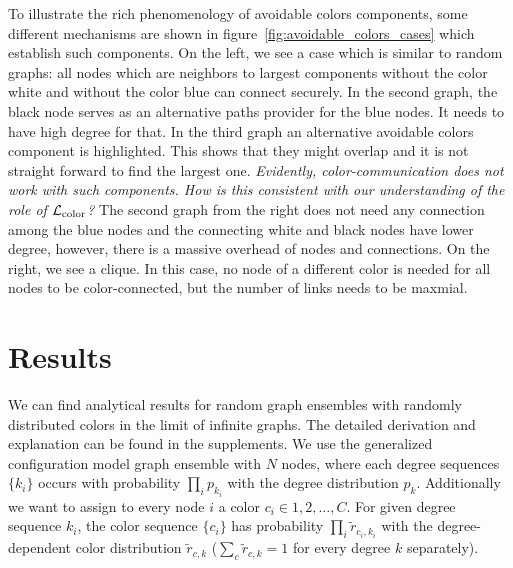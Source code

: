 \documentclass[aps, pre, twocolumn, a4paper, floatfix]{revtex4}
\newcommand{\red}{\color{red}}
\begin{document}
%
To illustrate the rich phenomenology of avoidable colors components,  
some different mechanisms are shown in figure~\ref{fig:avoidable_colors_cases} 
which establish such components.
On the left, we see a case which is similar to  random graphs: 
all nodes which are neighbors to largest components without 
the color white and without the color blue can connect securely. 
{\red
In the second graph, the black node serves as an alternative paths provider for the blue nodes. 
It needs to have high degree for that. 
In the third graph an alternative avoidable colors component is highlighted. 
This shows that they might overlap and it is not straight forward to find the largest 
one. \textit{Evidently, color-communication does not work with such components.  How is this consistent with our understanding of the role of $\mathcal{L}_{\rm color}$?}}
The second graph from the right does not need any connection among the blue nodes 
and the connecting white and black nodes have lower degree, 
however, there is a massive overhead of nodes and connections. 
On the right, we see a clique. In this case, no node 
of a different color is needed for all nodes to be color-connected, but the number of links needs to be maxmial.




\section{Results}

We can find analytical results for random graph ensembles with randomly distributed 
colors in the limit of infinite graphs. The detailed derivation and explanation 
can be found in the supplements. We use the generalized configuration model graph 
ensemble with $N$ nodes, where each degree sequences $\{k_i\}$ occurs with probability 
$\prod_i p_{k_i}$ with the degree distribution $p_{k}$. Additionally we want to assign to 
every node $i$ a color $c_i\in 1,2,\dots,C$. For given degree sequence $k_i$, the color 
sequence $\{c_i\}$ has probability $\prod_i {\tilde r}_{c_i,k_i}$ with the degree-dependent 
color distribution ${\tilde r}_{c,k}$ ($\sum_c {\tilde r}_{c,k}=1$ for every degree $k$ 
separately). 
\end{document}
